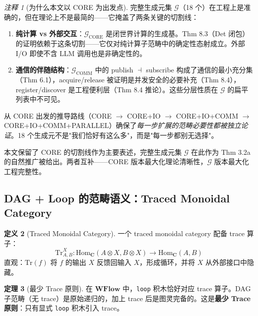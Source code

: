 \documentclass[11pt,a4paper]{article}
\theoremstyle{definition}
\newtheorem{theorem}{定理}[section]
\theoremstyle{definition}
\newtheorem{definition}[theorem]{定义}
\theoremstyle{remark}
\newtheorem{remark}[theorem]{注释}
\newcommand{\cat}[1]{\mathbf{#1}}
\newcommand{\catWFlow}{\cat{WFlow}}
\newcommand{\homset}[3]{\mathrm{Hom}_{#1}(#2, #3)}
\newcommand{\tensor}{\otimes}
\begin{document}
\begin{remark}[为什么本文以 CORE 为出发点]
完整生成元集 $\mathcal{G}$（18 个）在工程上是准确的，但在理论上不是最简的——它掩盖了两条关键的切割线：

\begin{enumerate}[leftmargin=1.5em,label=(\arabic*)]
    \item \textbf{纯计算 vs 外部交互}：$\mathcal{G}_{\mathrm{CORE}}$ 是闭世界计算的生成基。Thm 8.3（Det 闭包）的证明依赖于这条切割——它仅对纯计算子范畴中的确定性态射成立。外部 I/O 即使不含 LLM 调用也是非确定性的。
    \item \textbf{通信的伴随结构}：$\mathcal{G}_{\mathrm{COMM}}$ 中的 publish $\dashv$ subscribe 构成了通信的最小充分集（Thm 6.1），acquire/release 被证明是并发安全的必要补充（Thm 8.4），register/discover 是工程便利层（Thm 8.4 推论）。这些分层性质在 $\mathcal{G}$ 的扁平列表中不可见。
\end{enumerate}

从 CORE 出发的推导路线（CORE $\to$ CORE+IO $\to$ CORE+IO+COMM $\to$ CORE+IO+COMM+PARALLEL）确保了\emph{每一步扩展的范畴必要性都被独立论证}。18 个生成元不是"我们恰好有这么多"，而是"每一步都别无选择"。

本文保留了 CORE 的切割线作为主要表述，完整生成元集 $\mathcal{G}$ 在此作为 Thm 3.2a 的自然推广被给出。两者互补——CORE 版本最大化理论清晰性，$\mathcal{G}$ 版本最大化工程完整性。
\end{remark}

\subsection{DAG + Loop 的范畴语义：Traced Monoidal Category}

\begin{definition}[Traced Monoidal Category]
一个 traced monoidal category 配备 trace 算子：
\[
\mathrm{Tr}^{X}_{A,B}: \homset{\cat{C}}{A\tensor X}{B\tensor X} \to \homset{\cat{C}}{A}{B}
\]
直观：$\mathrm{Tr}(f)$ 将 $f$ 的输出 $X$ 反馈回输入 $X$，形成循环，并将 $X$ 从外部接口中隐藏。
\end{definition}

\begin{theorem}[最少 Trace 原则]
在 $\catWFlow$ 中，\texttt{loop} 积木恰好对应 trace 算子。DAG 子范畴（无 trace）是原始递归的，加上 trace 后是图灵完备的。这是\textbf{最少 Trace 原则}：只有显式 \texttt{loop} 积木引入 trace。
\end{theorem}
\end{document}
